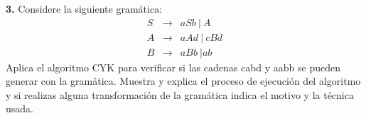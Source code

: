 \textbf{3.} Considere la siguiente gramática:
\begin{eqnarray*}
  S &\rightarrow& aSb\ |\ A\\
  A &\rightarrow& aAd\ |\ cBd\\
  B &\rightarrow& aBb\ | ab
\end{eqnarray*}
Aplica el algoritmo CYK para verificar si las cadenas cabd y aabb se pueden generar con la gramática.
Muestra y explica el proceso de ejecución del algoritmo y si realizas alguna transformación de la gramática
indica el motivo y la técnica usada.
